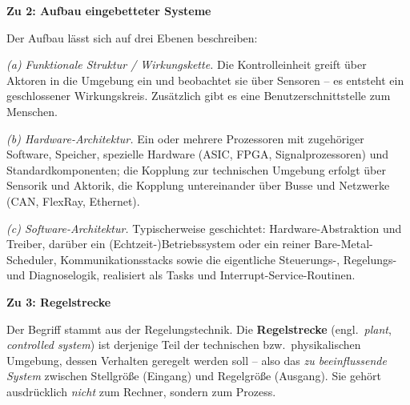 \begin{loesung}
\textbf{Zu 2: Aufbau eingebetteter Systeme}

Der Aufbau lässt sich auf drei Ebenen beschreiben:

\emph{(a) Funktionale Struktur / Wirkungskette.} Die Kontrolleinheit greift über Aktoren in die
Umgebung ein und beobachtet sie über Sensoren -- es entsteht ein geschlossener Wirkungskreis.
Zusätzlich gibt es eine Benutzerschnittstelle zum Menschen.

\begin{center}
\end{center}

\emph{(b) Hardware-Architektur.} Ein oder mehrere Prozessoren mit zugehöriger Software, Speicher,
spezielle Hardware (ASIC, FPGA, Signalprozessoren) und Standardkomponenten; die Kopplung zur
technischen Umgebung erfolgt über Sensorik und Aktorik, die Kopplung untereinander über Busse
und Netzwerke (CAN, FlexRay, Ethernet).

\emph{(c) Software-Architektur.} Typischerweise geschichtet: Hardware-Abstraktion und Treiber,
darüber ein (Echtzeit-)Betriebssystem oder ein reiner Bare-Metal-Scheduler, Kommunikationsstacks
sowie die eigentliche Steuerungs-, Regelungs- und Diagnoselogik, realisiert als Tasks und
Interrupt-Service-Routinen.

\textbf{Zu 3: Regelstrecke}

Der Begriff stammt aus der Regelungstechnik. Die \textbf{Regelstrecke} (engl.\ \emph{plant},
\emph{controlled system}) ist derjenige Teil der technischen bzw.\ physikalischen Umgebung, dessen
Verhalten geregelt werden soll -- also das \emph{zu beeinflussende System} zwischen Stellgröße
(Eingang) und Regelgröße (Ausgang). Sie gehört ausdrücklich \emph{nicht} zum Rechner, sondern zum
Prozess.


\end{loesung}
